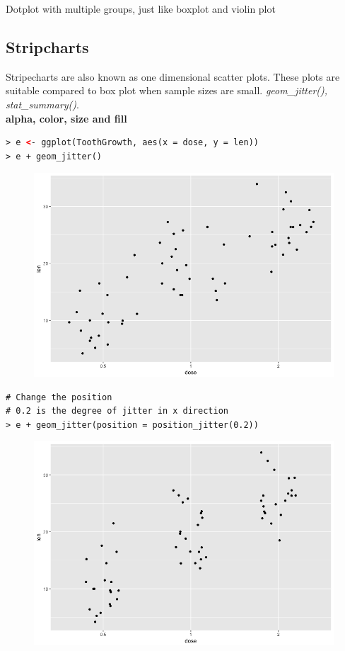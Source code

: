 Dotplot with multiple groups, just like boxplot and violin plot

\subsection{Stripcharts}
Stripecharts are also known as one dimensional scatter plots. These plots are suitable compared to box plot when sample sizes are small.\newline
\textit{geom\_jitter(), stat\_summary()}.\newline
\\
\textbf{alpha, color, size and fill}
\begin{lstlisting}[language=html]
> e <- ggplot(ToothGrowth, aes(x = dose, y = len))
> e + geom_jitter()
\end{lstlisting}
\begin{figure}[H]\begin{center}\includegraphics[scale=1 ]{ilu/bg109.png}\end{center}\end{figure} 
\begin{lstlisting}[language=html]
# Change the position
# 0.2 is the degree of jitter in x direction
> e + geom_jitter(position = position_jitter(0.2))
\end{lstlisting}
\begin{figure}[H]\begin{center}\includegraphics[scale=1 ]{ilu/bg110.png}\end{center}\end{figure} 
